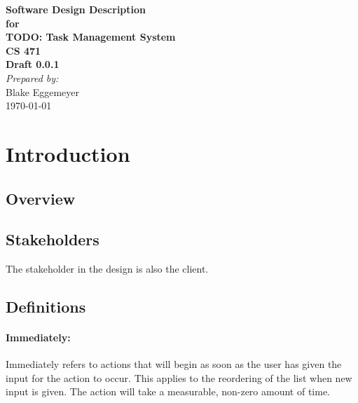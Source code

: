 \documentclass[12pt,a4paper]{article}
\begin{document}
\begin{titlepage}
\begin{flushright} 
{\LARGE \bfseries Software Design Description}\\[1.2cm]
{\large \bfseries for}\\[1.2cm]
{\huge \bfseries TODO: Task Management System}\\[1.2cm]
{\large \bfseries CS 471}\\
\vfill
{\large \bfseries Draft 0.0.1}\\[2cm]
\emph{Prepared by:} \\
Blake Eggemeyer \\ [3cm]
{\large \today}
\end{flushright}
\end{titlepage}
\setcounter{tocdepth}{3}
\setcounter{secnumdepth}{4}
\tableofcontents
\newpage

\section{Introduction}

\subsection{Overview}

\subsection{Stakeholders}
The stakeholder in the design is also the client.

\subsection{}

\subsection{Definitions}
\setcounter{paragraph}{0}
\setcounter{subsubsection}{1}
\paragraph{Immediately:} Immediately refers to actions that will begin as soon as the user has given the input for the action to occur.  This applies to the reordering of the list when new input is given.  The action will take a measurable, non-zero amount of time.
\end{document}
